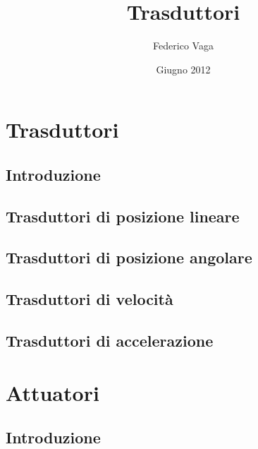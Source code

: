 \documentclass[a4paper,10pt]{book}
\title{Trasduttori}
\author{Federico Vaga}
\date{Giugno 2012}
\begin{document}


\tableofcontents
\listoffigures

\part{Trasduttori}
\chapter{Introduzione}

\chapter{Trasduttori di posizione lineare}

\chapter{Trasduttori di posizione angolare}

\chapter{Trasduttori di velocità}

\chapter{Trasduttori di accelerazione}


\part{Attuatori}
\chapter{Introduzione}

\end{document}
